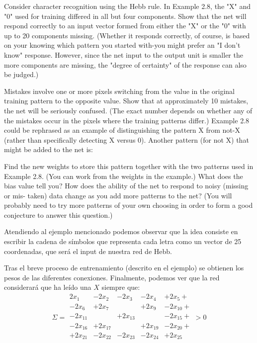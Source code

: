 \begin{problem}[3]
\ppart Consider character recognition using the Hebb rule. In Example 2.8, the "X" and
"0" used for training differed in all but four components. Show that the net will
respond correctly to an input vector formed from either the "X" or the "0" with
up to 20 components missing. (Whether it responds correctly, of course, is based on
your knowing which pattern you started with-you might prefer an "I don't know"
response. However, since the net input to the output unit is smaller the more components are missing, the "degree of certainty" of the response can also be judged.)

\ppart Mistakes involve one or more pixels switching from the value in the original
training pattern to the opposite value. Show that at approximately 10 mistakes, the
net will be seriously confused. (The exact number depends on whether any of the
mistakes occur in the pixels where the training patterns differ.)
Example 2.8 could be rephrased as an example of distinguishing the pattern X
from not-X (rather than specifically detecting X versus 0). Another pattern (for not X) that might be added to the net is:

\ppart Find the new weights to store this pattern together with the two patterns used in
Example 2.8. (You can work from the weights in the example.) What does the bias
value tell you? How does the ability of the net to respond to noisy (missing or mis-
taken) data change as you add more patterns to the net? (You will probably need to
try more patterns of your own choosing in order to form a good conjecture to answer
this question.)

\solution


Atendiendo al ejemplo mencionado podemos observar que la idea consiste en escribir la cadena de símbolos que representa cada letra como un vector de 25 coordenadas, que será el input de nuestra red de Hebb.

Tras el breve proceso de entrenamiento (descrito en el ejemplo) se obtienen los pesos de las diferentes conexiones. Finalmente, podemos ver que la red considerará que ha leído una $X$ siempre que:
\[Σ = \begin{array}{ccccc}
2x_1& -2x_2 & -2x_3 & -2x_4 & +2x_5 +\\
-2x_6 & + 2x_7 &  & + 2x_9 &- 2x_{10} +\\
-2x_{11} & & +2x_{13} & & -2x_{15} + \\
-2x_{16} & +2x_{17} & & +2x_{19} & -2x_{20} + \\
+2x_{21} & -2x_{22} & -2x_{23} & -2x_{24} & +2x_{25} \\
\end{array} > 0\]


\end{problem}
